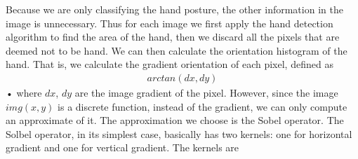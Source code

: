 Because we are only classifying the hand posture, the other information in the image is unnecessary. Thus for each image we first apply the hand detection algorithm to find the area of the hand, then we discard all the pixels that are deemed not to be hand. We can then calculate the orientation histogram of the hand. That is, we calculate the gradient orientation of each pixel, defined as
\begin{align}
arctan(dx, dy)
\end{align}•
where $dx$, $dy$ are the image gradient of the pixel. However, since the image $img(x,y)$ is a discrete function, instead of the gradient, we can only compute an approximate of it. The approximation we choose is the Sobel operator. The Solbel operator, in its simplest case, basically has two kernels: one for horizontal gradient and one for vertical gradient. The kernels are 
